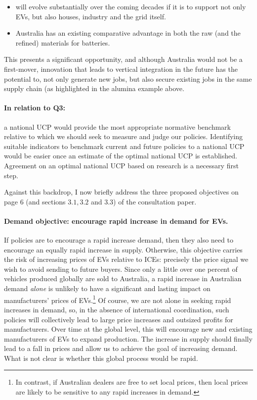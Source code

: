 \documentclass[12pt, draft]{article} \usepackage[shortlabels]{enumitem}
\begin{document}
\begin{itemize}
 
  \item will evolve substantially over the coming decades if it is to support
    not only EVs, but also houses, industry and the grid itself. 
 
  \item Australia has an existing comparative advantage in both the raw (and
    the refined) materials for batteries.

\end{itemize} 
   
This presents a significant opportunity, and although Australia would not
be a first-mover, innovation that leads to vertical integration in the
future has the potential to, not only generate new jobs, but also secure
existing jobs in the same supply chain (as highlighted in the alumina
example above.

\paragraph{In relation to Q3:} a national UCP would provide the most
appropriate normative benchmark relative to which we should seek to measure and
judge our policies. Identifying suitable indicators to benchmark current and
future policies to a national UCP would be easier once an estimate of the
optimal national UCP is established. Agreement on an optimal national UCP based
on research is a necessary first step.

\vskip20pt

Against this backdrop, I now briefly address the three proposed objectives on
page 6 (and sections $3.1, 3.2$ and $3.3$)
of the consultation paper.

\paragraph{Demand objective: encourage rapid increase in demand for EVs.} If
policies are to encourage a rapid increase demand, then they also need to
encourage an equally rapid increase in supply.  Otherwise, this objective
carries the risk of increasing prices of EVs relative to ICEs: precisely the
price signal we wish to avoid sending to future buyers.  Since only a little
over one percent of vehicles produced globally are sold to Australia, a rapid
increase in Australian demand \emph{alone} is unlikely to have a significant
and lasting impact on manufacturers' prices of EVs.\footnote{In contrast, if
Australian dealers are free to set local prices, then local prices are likely
to be sensitive to any rapid increases in demand.} Of course, we are not alone
in seeking rapid increases in demand, so, in the absence of international
coordination, such policies will collectively lead to large price increases and
outsized profits for manufacturers. Over time at the global level, this will
encourage new and existing manufacturers of EVs to expand production. The
increase in supply should finally lead to a fall in prices and allow us to
achieve the goal of increasing demand. What is not clear is whether this global
process would be rapid.
\end{document}
